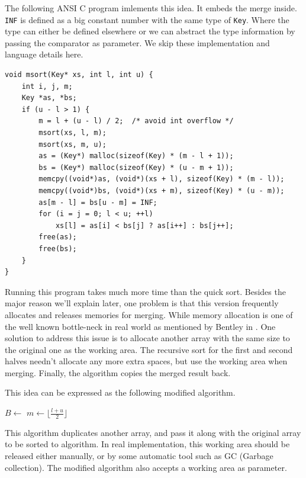 \documentclass[b5paper]{article}
\begin{document}
The following ANSI C program imlements this idea. It embeds the merge inside. \texttt{INF} is defined
as a big constant number with the same type of \texttt{Key}. Where the type can either be defined elsewhere
or we can abstract the type information by passing the comparator as parameter. We skip these
implementation and language details here.

\lstset{language=C}
\begin{lstlisting}
void msort(Key* xs, int l, int u) {
    int i, j, m;
    Key *as, *bs;
    if (u - l > 1) {
        m = l + (u - l) / 2;  /* avoid int overflow */
        msort(xs, l, m);
        msort(xs, m, u);
        as = (Key*) malloc(sizeof(Key) * (m - l + 1));
        bs = (Key*) malloc(sizeof(Key) * (u - m + 1));
        memcpy((void*)as, (void*)(xs + l), sizeof(Key) * (m - l));
        memcpy((void*)bs, (void*)(xs + m), sizeof(Key) * (u - m));
        as[m - l] = bs[u - m] = INF;
        for (i = j = 0; l < u; ++l)
            xs[l] = as[i] < bs[j] ? as[i++] : bs[j++];
        free(as);
        free(bs);
    }
}
\end{lstlisting}

Running this program takes much more time than the quick sort. Besides the major reason we'll explain later,
one problem is that this version frequently allocates and releases memories for merging. While memory
allocation is one of the well known bottle-neck in real world as mentioned by Bentley in \cite{Bentley}.
One solution to address this issue is to allocate another array with the same size to the original one
as the working area. The recursive sort for the first and second halves needn't allocate any more
extra spaces, but use the working area when merging. Finally, the algorithm copies
the merged result back.

This idea can be expressed as the following modified algorithm.

\begin{algorithmic}[1]
  \State $B \gets $ 
  \State {}
\EndProcedure
\Statex
{}
    \State $m \gets \lfloor \frac{l + u}{2} \rfloor$
    \State {}
    \State {}
    \State {}
  \EndIf
\EndProcedure
\end{algorithmic}

This algorithm duplicates another array, and pass it along with the original array to be sorted
to  algorithm. In real implementation, this working area should be released
either manually, or by some automatic tool such as GC (Garbage collection).
The modified algorithm  also accepts a working area as parameter.
\end{document}
